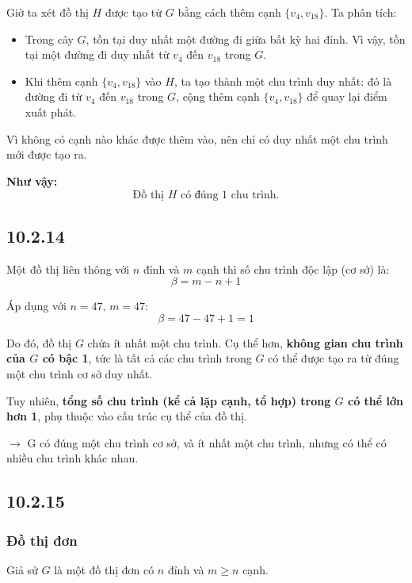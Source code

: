 \documentclass{article}
\begin{document}
	Giờ ta xét đồ thị $H$ được tạo từ $G$ bằng cách thêm cạnh $\{v_4, v_{18}\}$. Ta phân tích:
	
	\begin{itemize}
		\item Trong cây $G$, tồn tại duy nhất một đường đi giữa bất kỳ hai đỉnh. Vì vậy, tồn tại một đường đi duy nhất từ $v_4$ đến $v_{18}$ trong $G$.
		\item Khi thêm cạnh $\{v_4, v_{18}\}$ vào $H$, ta tạo thành một chu trình duy nhất: đó là đường đi từ $v_4$ đến $v_{18}$ trong $G$, cộng thêm cạnh $\{v_4, v_{18}\}$ để quay lại điểm xuất phát.
	\end{itemize}
	
	Vì không có cạnh nào khác được thêm vào, nên chỉ có duy nhất một chu trình mới được tạo ra.
	
	\noindent \textbf{Như vậy:}
	\[
	\boxed{\text{Đồ thị } H \text{ có đúng } 1 \text{ chu trình.}}
	\]
	
	\subsection*{10.2.14}
	Một đồ thị liên thông với $n$ đỉnh và $m$ cạnh thì số chu trình độc lập (cơ sở) là:
	\[
	\beta = m - n + 1
	\]
	
	Áp dụng với $n = 47$, $m = 47$:
	\[
	\beta = 47 - 47 + 1 = 1
	\]
	
	Do đó, đồ thị $G$ chứa ít nhất một chu trình.  
	Cụ thể hơn, \textbf{không gian chu trình của $G$ có bậc 1}, tức là tất cả các chu trình trong $G$ có thể được tạo ra từ đúng một chu trình cơ sở duy nhất.
	
	Tuy nhiên, \textbf{tổng số chu trình (kể cả lặp cạnh, tổ hợp) trong $G$ có thể lớn hơn 1}, phụ thuộc vào cấu trúc cụ thể của đồ thị.
	
	
	$\rightarrow$ G có đúng một chu trình cơ sở, và ít nhất một chu trình, nhưng có thể có nhiều chu trình khác nhau.
	
	\subsection*{10.2.15}
	\subsubsection*{Đồ thị đơn}
	
	Giả sử $G$ là một đồ thị đơn có $n$ đỉnh và $m \geq n$ cạnh.
	
\end{document}
